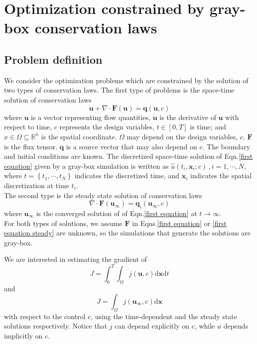 \documentclass[a4paper,onecolumn]{article}
\theoremstyle{remark}
\begin{document}
\section {Optimization constrained by gray-box conservation laws}
\label{prototypes}

\subsection{Problem definition}
\indent We consider the optimization problems which are constrained by the solution of two types of
conservation laws.
The first type of problems is the space-time solution of conservation laws
\begin{equation}
    \dot{\boldsymbol{u}} + \nabla \cdot {\boldsymbol{F}}
    (\boldsymbol{u})
    = \boldsymbol{q}(\boldsymbol{u},c)
    \label{first equation}
\end{equation}
where $\boldsymbol{u}$ is a vector representing flow quantities,
$\dot{\boldsymbol{u}}$ is the derivative of $\boldsymbol{u}$ with respect to time,
$c$ represents the design variables,
$t\in[0,T]$ is time;
and $x\in \Omega \subseteq \mathbb{R}^{n}$ is the spatial coordinate.
$\Omega$ may depend on the design variables, $c$.
${\boldsymbol{F}}$ is the flux tensor.
$\boldsymbol{q}$ is a source vector that may also depend on $c$.
The boundary and initial conditions are known.
The discretized space-time solution of Eqn.\eqref{first equation} given by a gray-box simulation
is written as $\hat{u}(t_i, \mathbf{x}_i; c)\,, i=1,\cdots,N$, where
$t=\left\{t_1,\cdots, t_N\right\}$ indicates the discretized time, and 
$\mathbf{x}_i$ indicates the spatial discretization at time $t_i$.\\

\indent The second type is the steady state solution of conservation laws
\begin{equation}
    \nabla \cdot 
    {\boldsymbol{F}}(\boldsymbol{u}_{\infty}) 
    = \boldsymbol{q}_i(\boldsymbol{u}_{\infty},c)
    \label{first equation steady}
\end{equation}
where $\boldsymbol{u}_{\infty}$ is the converged solution of 
of Eqn.\eqref{first equation} at $t\rightarrow \infty$.\\

\indent For both types of solutions, we assume $\boldsymbol{F}$ in Eqns.\eqref{first equation} or \eqref{first equation steady} are unknown, so the simulations that generate the solutions are gray-box. 

\indent We are interested in estimating the gradient of
\begin{equation}
    J = \int_0^T \int_\Omega j(\boldsymbol{u},c) \textrm{d}\mathbf{x}\textrm{d}t
    \label{obj prototype}
\end{equation}
and
\begin{equation}
    J = \int_\Omega j(\boldsymbol{u}_{\infty},c) \textrm{d}\mathbf{x}
\end{equation}
with respect to the control $c$, 
using the time-dependent and the steady state solutions respectively.
Notice that $j$ can depend explicitly on c, while $u$ depends implicitly on $c$.
\end{document}
